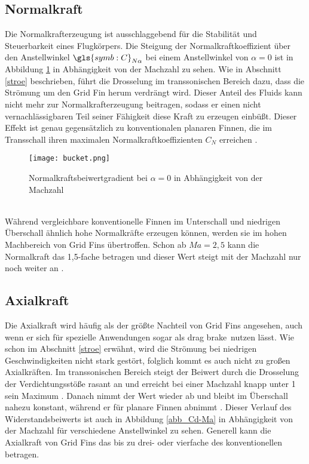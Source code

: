 \subsection{Normalkraft}
Die Normalkrafterzeugung ist ausschlaggebend für die Stabilität und Steuerbarkeit eines Flugkörpers. Die Steigung der Normalkraftkoeffizient über den Anstellwinkel $\gls{symb:C}_{N\alpha}$ bei einem Anstellwinkel von $\alpha = 0$ ist in Abbildung \ref{abb_bucket} in Abhängigkeit von der Machzahl zu sehen. Wie in Abschnitt \ref{stroe} beschrieben, führt die Drosselung im transsonischen Bereich dazu, dass die Strömung um den Grid Fin herum verdrängt wird. Dieser Anteil des Fluids kann nicht mehr zur Normalkrafterzeugung beitragen, sodass er einen nicht vernachlässigbaren Teil seiner Fähigkeit diese Kraft zu erzeugen einbüßt. Dieser Effekt ist genau gegensätzlich zu konventionalen planaren Finnen, die im Transschall ihren maximalen Normalkraftkoeffizienten $C_N$ erreichen \cite{synopsis}.
\begin{figure}[h]
	\centering
	\texttt{[image: bucket.png]}
	\caption{Normalkraftsbeiwertgradient bei $\alpha = 0$ in Abhängigkeit von der Machzahl}
	\label{abb_bucket}
\end{figure}\\
Während vergleichbare konventionelle Finnen im Unterschall und niedrigen Überschall ähnlich hohe Normalkräfte erzeugen können, werden sie im hohen Machbereich von Grid Fins übertroffen. Schon ab $Ma=2,5$ kann die Normalkraft das 1,5-fache betragen und dieser Wert steigt mit der Machzahl nur noch weiter an \cite{synopsis,vergleichPlanarNATO}.
\subsection{Axialkraft}
Die Axialkraft wird häufig als der größte Nachteil von Grid Fins angesehen, auch wenn er sich für spezielle Anwendungen sogar als \grqq drag brake\grqq \ nutzen lässt. Wie schon im Abschnitt \ref{stroe} erwähnt, wird die Strömung bei niedrigen Geschwindigkeiten nicht stark gestört, folglich kommt es auch nicht zu großen Axialkräften. Im transsonischen Bereich steigt der Beiwert durch die Drosselung der Verdichtungsstöße rasant an und erreicht bei einer Machzahl knapp unter 1 sein Maximum \cite{solver}. Danach nimmt der Wert wieder ab und bleibt im Überschall nahezu konstant, während er für planare Finnen abnimmt \cite{vergleichPlanarNATO}. Dieser Verlauf des Widerstandsbeiwerts ist auch in Abbildung \ref{abb_Cd-Ma} in Abhängigkeit von der Machzahl für verschiedene Anstellwinkel zu sehen. Generell kann die Axialkraft von Grid Fins das bis zu drei- oder  vierfache des konventionellen betragen.
